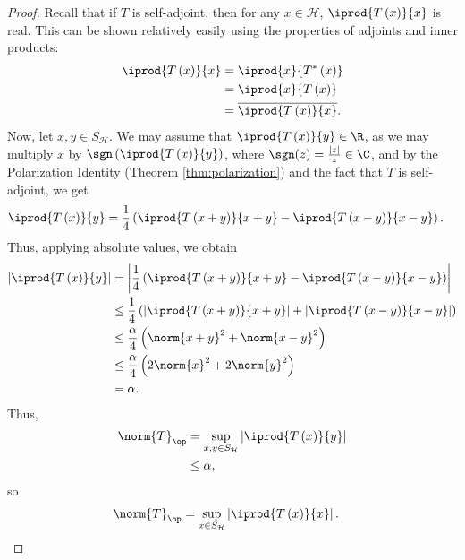 \begin{proof}
  Recall that if $T$ is self-adjoint, then for any $x\in \mathcal{H}$, $ \iprod{T\left( x \right)}{x} $ is real. This can be shown relatively easily using the properties of adjoints and inner products:
  \begin{align*}
    \iprod{T\left( x \right)}{x} &= \iprod{x}{T^{\ast}\left( x \right)}\\
                                 &= \iprod{x}{T\left( x \right)}\\
                                 &= \overline{ \iprod{T\left( x \right)}{x} }.
  \end{align*}
  Now, let $x,y\in S_{\mathcal{H}}$. We may assume that $ \iprod{T\left( x \right)}{y} \in \R $, as we may multiply $x$ by $\sgn\left( \iprod{T\left( x \right)}{y} \right)$, where $\sgn(z) = \frac{|z|}{z}\in \C$, and by the Polarization Identity (Theorem \ref{thm:polarization}) and the fact that $T$ is self-adjoint, we get
  \begin{align*}
    \iprod{T\left( x \right)}{y} &= \frac{1}{4}\left( \iprod{T\left( x+y \right)}{x+y} - \iprod{T\left( x-y \right)}{x-y} \right).
  \end{align*}
  Thus, applying absolute values, we obtain
  \begin{align*}
    \left\vert \iprod{T\left( x \right)}{y}  \right\vert &= \left\vert \frac{1}{4}\left( \iprod{T\left( x+y \right)}{x+y} - \iprod{T\left( x-y \right)}{x-y} \right) \right\vert\\
                                                         &\leq \frac{1}{4}\left( \left\vert \iprod{T\left( x+y \right)}{x+y} \right\vert +  \left\vert \iprod{T\left( x-y \right)}{x-y} \right\vert\right)\\
                                                         &\leq \frac{\alpha}{4} \left( \norm{x+y}^2 + \norm{x-y}^2 \right)\\
                                                         &\leq \frac{\alpha}{4} \left( 2\norm{x}^2 + 2\norm{y}^2 \right)\\
                                                         &= \alpha.
  \end{align*}
  Thus,
  \begin{align*}
    \norm{T}_{\op} &= \sup_{x,y\in S_{\mathcal{H}}} \left\vert \iprod{T\left( x \right)}{y} \right\vert\\
                   &\leq \alpha,
  \end{align*}
  so
  \begin{align*}
    \norm{T}_{\op} &= \sup_{x\in S_{\mathcal{H}}} \left\vert \iprod{T\left( x \right)}{x} \right\vert.
  \end{align*}
\end{proof}
